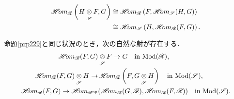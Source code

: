 \begin{leftbar}
    \begin{PRP}\label{prp229}
        \begin{align}
            \HOM_{\scR}\left(H\ttens[\scS]F,G\right)
            &\cong
            \HOM_{\scR}\left(F,\HOM_{\scS}(H,G)\right)\label{eq229}\\
            &\cong
            \HOM_{\scS}\left(H,\HOM_{\scR}(F,G)\right).\notag
        \end{align}
    \end{PRP}
\end{leftbar}
\begin{leftbar}
    \begin{CRL}\label{crl2210}
        命題\ref{prp229}と同じ状況のとき，次の自然な射が存在する．
        \begin{align}
            \HOM_{\scR}(F,G)&\ttens[\scS]F\to G\quad\text{in \(\Mod(\scR)\)},\label{eq2210}\\
            \HOM_{\scR}(F,G)\ttens[\scS]H
            \to&\HOM_{\scR}\left(F,G\ttens[\scS]H\right)
            \quad\text{in \(\Mod(\scS)\)},\label{eq2211}\\
            \HOM_{\scR}(F,G)
            \to
            \HOM_{\scR^{\op}}&(
                \HOM_{\scR}(G,\scR),\HOM_{\scR}(F,\scR)
            )\quad\text{in \(\Mod(\scS)\)}.\label{eq2212}
        \end{align}
    \end{CRL}
\end{leftbar}

